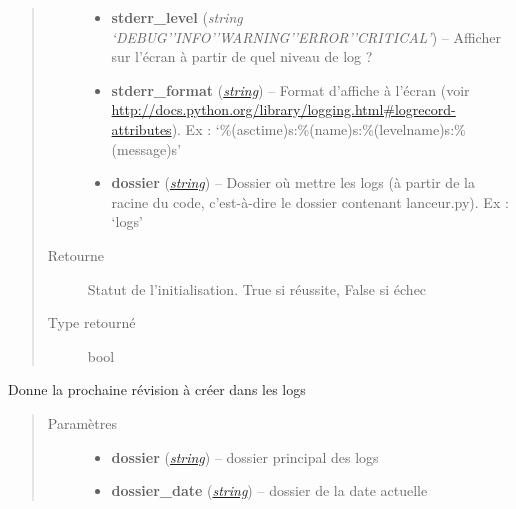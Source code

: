 \documentclass[letterpaper,10pt,french]{sphinxmanual}
\begin{document}
\begin{fulllineitems}
\begin{fulllineitems}
\begin{quote}
\begin{description}
\begin{itemize}
\item {} 
\textbf{stderr\_level} (\emph{string `DEBUG'\textbar{}'INFO'\textbar{}'WARNING'\textbar{}'ERROR'\textbar{}'CRITICAL'}) -- Afficher sur l'écran à partir de quel niveau de log ?

\item {} 
\textbf{stderr\_format} (\href{http://docs.python.org/library/string.html\#module-string}{\emph{string}}) -- Format d'affiche à l'écran (voir \href{http://docs.python.org/library/logging.html\#logrecord-attributes}{http://docs.python.org/library/logging.html\#logrecord-attributes}). Ex : `\%(asctime)s:\%(name)s:\%(levelname)s:\%(message)s'

\item {} 
\textbf{dossier} (\href{http://docs.python.org/library/string.html\#module-string}{\emph{string}}) -- Dossier où mettre les logs (à partir de la racine du code, c'est-à-dire le dossier contenant lanceur.py). Ex : `logs'

\end{itemize}

\item[{Retourne}] \leavevmode
Statut de l'initialisation. True si réussite, False si échec

\item[{Type retourné}] \leavevmode
bool

\end{description}\end{quote}

\end{fulllineitems}


\begin{fulllineitems}
\label{log:lib.log.Log.revision_disponible}
Donne la prochaine révision à créer dans les logs
\begin{quote}\begin{description}
\item[{Paramètres}] \leavevmode\begin{itemize}
\item {} 
\textbf{dossier} (\href{http://docs.python.org/library/string.html\#module-string}{\emph{string}}) -- dossier principal des logs

\item {} 
\textbf{dossier\_date} (\href{http://docs.python.org/library/string.html\#module-string}{\emph{string}}) -- dossier de la date actuelle


\end{itemize}
\end{description}
\end{quote}
\end{fulllineitems}
\end{fulllineitems}
\end{document}
